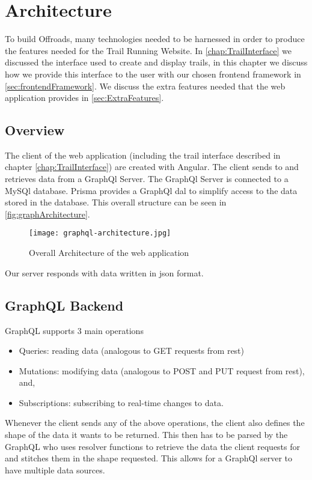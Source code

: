 \chapter{Architecture} \label{chap:Architecture}
To build Offroads, many technologies needed to be harnessed in order to produce the features needed for the Trail Running Website. In \autoref{chap:TrailInterface} we discussed the interface used to create and display trails, in this chapter we discuss how we provide this interface to the user with our chosen \Gls{frontend} framework in \autoref{sec:frontendFramework}. We discuss the extra features needed that the web application provides in \autoref{sec:ExtraFeatures}.

\section{Overview}
The client of the web application (including the trail interface described in chapter \ref{chap:TrailInterface}) are created with Angular. The client sends to and retrieves data from a GraphQl Server. The GraphQl Server is connected to a MySQl database. Prisma provides a GraphQl \acrfull{dal} to simplify access to the data stored in the database. This overall structure can be seen in \autoref{fig:graphArchitecture}.

\begin{figure}[htb!]
    \centering
    \texttt{[image: graphql-architecture.jpg]}
    \caption{Overall Architecture of the web application}
    \label{fig:graphArchitecture}
\end{figure}

Our server responds with data written in \acrfull{json} format.

\section{GraphQL Backend}
GraphQL supports 3 main operations
\begin{itemize}
    \item Queries: reading data (analogous to GET requests from \acrshort{rest})
    \item Mutations: modifying data (analogous to POST and PUT request from \acrshort{rest}), and,
    \item Subscriptions: subscribing to real-time changes to data.
\end{itemize}

Whenever the client sends any of the above operations, the client also defines the shape of the data it wants to be returned. This then has to be parsed by the GraphQL who uses resolver functions to retrieve the data the client requests for and stitches them in the shape requested. This allows for a GraphQl server to have multiple data sources.

